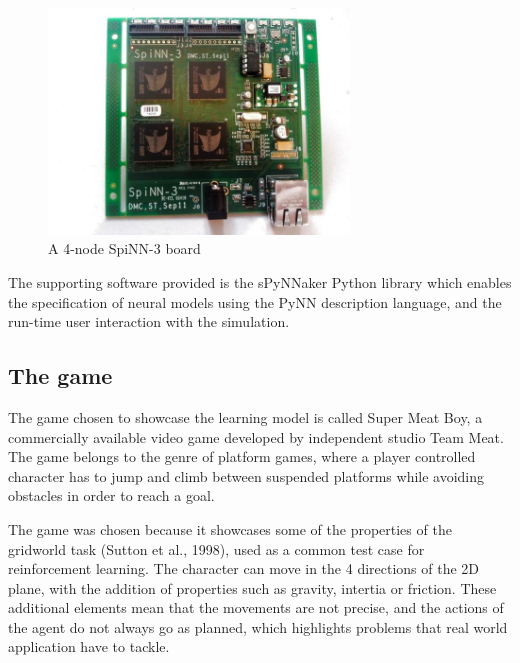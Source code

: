 \documentclass[10pt]{article}
\begin{document}
    \begin{figure}[ht!]
    \centering
    \includegraphics[width=80mm]{./SpiNN-3.jpg}
    \caption{A 4-node SpiNN-3 board \label{overflow}}
    \label{fig:spinnBoard}
    \end{figure}

    \setcounter{figure}{2}

    The supporting software provided is the sPyNNaker Python library which enables the specification of neural models using the PyNN description language, and the run-time user interaction with the simulation.

    \subsection{The game}

    The game chosen to showcase the learning model is called Super Meat Boy, a commercially available video game developed by independent studio Team Meat. The game belongs to the genre of platform games, where a player controlled character has to jump and climb between suspended platforms while avoiding obstacles in order to reach a goal.   

    The game was chosen because it showcases some of the properties of the gridworld task (Sutton et al., 1998), used as a common test case for reinforcement learning. The character can move in the 4 directions of the 2D plane, with the addition of properties such as gravity, intertia or friction. These additional elements mean that the movements are not precise, and the actions of the agent do not always go as planned, which highlights problems that real world application have to tackle.
\end{document}
